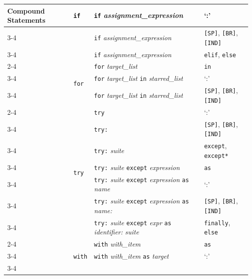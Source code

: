 \documentclass[letterpaper]{article} %
\theoremstyle{acmdefinition}
\begin{document}
\begin{table}[!t]
\begin{tabular}{m{2.8cm}m{2cm}m{6.5cm}m{5cm}}
        \hline
        \multirow{31}{*}{Compound Statements} 
        & \multirow{3}{*}{\texttt{if}} & \texttt{if} \textit{assignment\_expression} & `:'\\
        \cmidrule{3-4}
        & & \texttt{if} \textit{assignment\_expression}\text{:} & \texttt{[SP]}, \texttt{[BR]}, \texttt{[IND]} \\
        \cmidrule{3-4}
        & & \texttt{if} \textit{assignment\_expression}\text{:} & \texttt{elif}, \texttt{else}\\
        \cmidrule{2-4}
        & \multirow{3}{*}{\texttt{for}}   & \texttt{for} \textit{target\_list}  & \texttt{in}\\
        \cmidrule{3-4}
        & & \texttt{for} \textit{target\_list} \texttt{in} \textit{starred\_list}  & `:' \\
        \cmidrule{3-4}
        & & \texttt{for} \textit{target\_list} \texttt{in} \textit{starred\_list}\text{:} & \texttt{[SP]}, \texttt{[BR]}, \texttt{[IND]}  \\
        \cmidrule{2-4}
        & \multirow{7}{*}{\texttt{try}} &  \texttt{try} &  `:' \\
        \cmidrule{3-4}
        & & \texttt{try:} & \texttt{[SP]},  \texttt{[BR]}, \texttt{[IND]} \\
        \cmidrule{3-4}
        & & \texttt{try:} \textit{suite} & \texttt{except}, \texttt{except*} \\
        \cmidrule{3-4}
        & & \texttt{try:} \textit{suite} \texttt{except} \textit{expression}  &  \texttt{as} \\
        \cmidrule{3-4}
        & & \texttt{try:} \textit{suite} \texttt{except} \textit{expression} \texttt{as} \textit{name} & `:' \\
         \cmidrule{3-4}
         & & \texttt{try:} \textit{suite} \texttt{except} \textit{expression} \texttt{as} \textit{name:} & \texttt{[SP]},  \texttt{[BR]}, \texttt{[IND]}\\
         \cmidrule{3-4}

        & & \texttt{try:} \textit{suite} \texttt{except} \textit{expr} \texttt{as} \textit{identifier:} \textit{suite} & \texttt{finally}, \texttt{else} \\
        \cmidrule{2-4}
        & \multirow{3}{*}{\texttt{with}} & \texttt{with} \textit{with\_item} & \texttt{as} \\
        \cmidrule{3-4}
        & & \texttt{with} \textit{with\_item} \texttt{as} \textit{target} & `:' \\
        \cmidrule{3-4}


\end{tabular}
\end{table}
\end{document}
